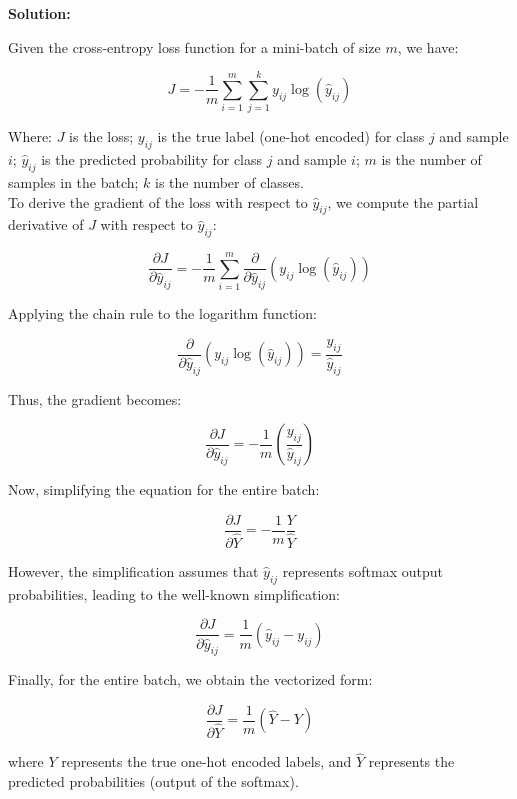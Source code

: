 \documentclass{article}
\newenvironment{solution}{\color{blue} \smallskip \textbf{Solution:}}{}
\begin{document}
\begin{solution}


Given the cross-entropy loss function for a mini-batch of size \(m\), we have:

\[
J = -\frac{1}{m} \sum_{i=1}^{m} \sum_{j=1}^{k} y_{ij} \log(\hat{y}_{ij})
\]

Where:
\( J \) is the loss;
\( y_{ij} \) is the true label (one-hot encoded) for class \( j \) and sample \( i \);
\( \hat{y}_{ij} \) is the predicted probability for class \( j \) and sample \( i \);
\( m \) is the number of samples in the batch;
 \( k \) is the number of classes.\\

To derive the gradient of the loss with respect to \( \hat{y}_{ij} \), we compute the partial derivative of \( J \) with respect to \( \hat{y}_{ij} \):

\[
\frac{\partial J}{\partial \hat{y}_{ij}} = -\frac{1}{m} \sum_{i=1}^{m} \frac{\partial}{\partial \hat{y}_{ij}} \left( y_{ij} \log(\hat{y}_{ij}) \right)
\]

Applying the chain rule to the logarithm function:

\[
\frac{\partial}{\partial \hat{y}_{ij}} \left( y_{ij} \log(\hat{y}_{ij}) \right) = \frac{y_{ij}}{\hat{y}_{ij}}
\]

Thus, the gradient becomes:

\[
\frac{\partial J}{\partial \hat{y}_{ij}} = -\frac{1}{m} \left( \frac{y_{ij}}{\hat{y}_{ij}} \right)
\]

Now, simplifying the equation for the entire batch:

\[
\frac{\partial J}{\partial \hat{Y}} = -\frac{1}{m} \frac{Y}{\hat{Y}}
\]

However, the simplification assumes that \( \hat{y}_{ij} \) represents softmax output probabilities, leading to the well-known simplification:

\[
\frac{\partial J}{\partial \hat{y}_{ij}} = \frac{1}{m} (\hat{y}_{ij} - y_{ij})
\]

Finally, for the entire batch, we obtain the vectorized form:

\[
\frac{\partial J}{\partial \hat{Y}} = \frac{1}{m} (\hat{Y} - Y)
\]

where \( Y \) represents the true one-hot encoded labels, and \( \hat{Y} \) represents the predicted probabilities (output of the softmax).







\end{solution}
\end{document}
